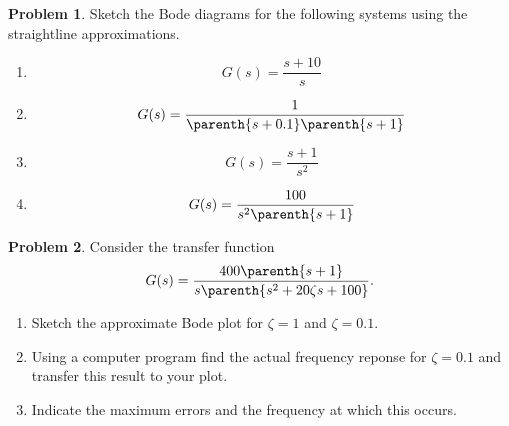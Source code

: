 \documentclass[10pt]{article}
\theoremstyle{definition}
\newtheorem{prob}{Problem}[section]
\newenvironment{subprob}%
{\renewcommand{\theenumi}{\alph{enumi}}\renewcommand{\labelenumi}{(\theenumi)}\begin{enumerate}}%
{\end{enumerate}}%
\begin{document}
\begin{prob}
    Sketch the Bode diagrams for the following systems using the straightline approximations.

    \begin{subprob}
    \item \[ G(s) = \frac{s + 10}{s}\]
    \item \[ G(s) = \frac{1}{\parenth{s+0.1}\parenth{s+1}} \]
    \item \[ G(s) = \frac{s +1}{s^2} \]
    \item \[ G(s) = \frac{100}{s^2 \parenth{s+1}} \]
    \end{subprob}
\end{prob}

\clearpage\newpage
\begin{prob}
    Consider the transfer function 
    \begin{align*}
        G(s) = \frac{400 \parenth{s+1}}{s \parenth{s^2 + 20 \zeta s + 100}} . 
    \end{align*}

    \begin{subprob}
        \item Sketch the approximate Bode plot for \( \zeta = 1\) and \( \zeta = 0.1\).
        \item Using a computer program find the actual frequency reponse for \( \zeta = 0.1 \) and transfer this result to your plot.
        \item Indicate the maximum errors and the frequency at which this occurs.
    \end{subprob}
\end{prob}
\end{document}
